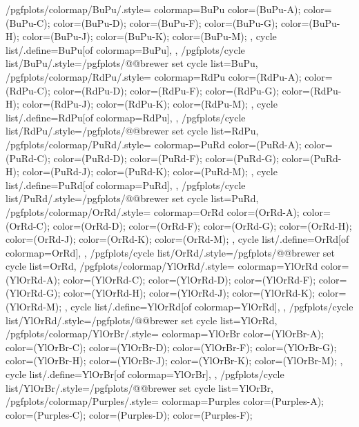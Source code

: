 {  /pgfplots/colormap/BuPu/.style={
    colormap={BuPu}{
      color=(BuPu-A);
      color=(BuPu-C);
      color=(BuPu-D);
      color=(BuPu-F);
      color=(BuPu-G);
      color=(BuPu-H);
      color=(BuPu-J);
      color=(BuPu-K);
      color=(BuPu-M);
    },
    cycle list/.define={BuPu}{[of colormap=BuPu]},
  },
  /pgfplots/cycle list/BuPu/.style={/pgfplots/@@brewer set cycle list={BuPu}},
  /pgfplots/colormap/RdPu/.style={
    colormap={RdPu}{
      color=(RdPu-A);
      color=(RdPu-C);
      color=(RdPu-D);
      color=(RdPu-F);
      color=(RdPu-G);
      color=(RdPu-H);
      color=(RdPu-J);
      color=(RdPu-K);
      color=(RdPu-M);
    },
    cycle list/.define={RdPu}{[of colormap=RdPu]},
  },
  /pgfplots/cycle list/RdPu/.style={/pgfplots/@@brewer set cycle list={RdPu}},
  /pgfplots/colormap/PuRd/.style={
    colormap={PuRd}{
      color=(PuRd-A);
      color=(PuRd-C);
      color=(PuRd-D);
      color=(PuRd-F);
      color=(PuRd-G);
      color=(PuRd-H);
      color=(PuRd-J);
      color=(PuRd-K);
      color=(PuRd-M);
    },
    cycle list/.define={PuRd}{[of colormap=PuRd]},
  },
  /pgfplots/cycle list/PuRd/.style={/pgfplots/@@brewer set cycle list={PuRd}},
  /pgfplots/colormap/OrRd/.style={
    colormap={OrRd}{
      color=(OrRd-A);
      color=(OrRd-C);
      color=(OrRd-D);
      color=(OrRd-F);
      color=(OrRd-G);
      color=(OrRd-H);
      color=(OrRd-J);
      color=(OrRd-K);
      color=(OrRd-M);
    },
    cycle list/.define={OrRd}{[of colormap=OrRd]},
  },
  /pgfplots/cycle list/OrRd/.style={/pgfplots/@@brewer set cycle list={OrRd}},
  /pgfplots/colormap/YlOrRd/.style={
    colormap={YlOrRd}{
      color=(YlOrRd-A);
      color=(YlOrRd-C);
      color=(YlOrRd-D);
      color=(YlOrRd-F);
      color=(YlOrRd-G);
      color=(YlOrRd-H);
      color=(YlOrRd-J);
      color=(YlOrRd-K);
      color=(YlOrRd-M);
    },
    cycle list/.define={YlOrRd}{[of colormap=YlOrRd]},
  },
  /pgfplots/cycle list/YlOrRd/.style={/pgfplots/@@brewer set cycle list={YlOrRd}},
  /pgfplots/colormap/YlOrBr/.style={
    colormap={YlOrBr}{
      color=(YlOrBr-A);
      color=(YlOrBr-C);
      color=(YlOrBr-D);
      color=(YlOrBr-F);
      color=(YlOrBr-G);
      color=(YlOrBr-H);
      color=(YlOrBr-J);
      color=(YlOrBr-K);
      color=(YlOrBr-M);
    },
    cycle list/.define={YlOrBr}{[of colormap=YlOrBr]},
  },
  /pgfplots/cycle list/YlOrBr/.style={/pgfplots/@@brewer set cycle list={YlOrBr}},
  /pgfplots/colormap/Purples/.style={
    colormap={Purples}{
      color=(Purples-A);
      color=(Purples-C);
      color=(Purples-D);
      color=(Purples-F);
}}}

